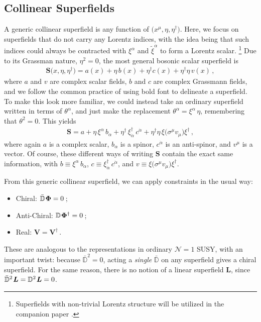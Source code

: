 \documentclass[12pt,document,nofootinbib,superscriptaddress,onecolumn,preprintnumbers,balancelastpage]{article}
\newcommand{\s}{\hspace{0.8pt}}
\newcommand{\D}{\mathbb{D}}
\begin{document}
\begin{spacing}{1.2}
\subsection{Collinear Superfields}
\label{sec:Superfields}
A generic collinear superfield is any function of $\big(x^\mu,\eta,\eta^\dagger\big)$.
%
Here, we focus on superfields that do not carry any Lorentz indices, with the idea being that such indices could always be contracted with $\xi^\alpha$ and $\tilde{\xi}^\alpha$ to form a Lorentz scalar.%
%
\footnote{Superfields with non-trivial Lorentz structure will be utilized in the companion paper \cite{Cohen:2019gsc}.} 
%
Due to its Grassman nature, $\eta^2 = 0$, the most general bosonic scalar superfield is
%
\begin{align}
\label{eq:Snotation}
\boldsymbol{S}\big(x,\eta,\eta^\dagger\big) = a(x) + \eta \, b(x) + \eta^\dagger c(x) + \eta^\dagger \eta \, v(x)\,,
\end{align}
%
where $a$ and $v$ are complex scalar fields, $b$ and $c$ are complex Grassmann fields, and we follow the common practice of using bold font to delineate a superfield.
%
To make this look more familiar, we could instead take an ordinary superfield written in terms of $\theta^\alpha$, and just make the replacement $\theta^\alpha = \xi^\alpha \,\eta$, remembering that $\theta^2 = 0$.
%
This yields
\begin{align}
\label{eq:altSnotation}
\boldsymbol{S} = a + \eta \, \xi^\alpha\, b_\alpha + \eta^\dagger\, \xi^\dagger_{\dot{\alpha}} \,c^{\dot{\alpha}} + \eta^\dagger \eta \, \xi \big(\sigma^\mu v_\mu\big) \xi^\dagger\,,
\end{align}
where again $a$ is a complex scalar, $b_\alpha$ is a spinor, $c^{\dot{\alpha}}$ is an anti-spinor, and $v^\mu$ is a vector.
%
Of course, these different ways of writing $\boldsymbol{S}$ contain the exact same information, with $b \equiv \xi^\alpha \,b_\alpha$, $c  \equiv \xi^\dagger_{\dot{\alpha}} \,c^{\dot{\alpha}}$, and $v \equiv \xi \big(\sigma^\mu v_\mu\big) \xi^\dagger$.

From this generic collinear superfield, we can apply constraints in the usual way:
%
\begin{itemize}
\item{Chiral: $\bar{\D}\s \boldsymbol{\Phi} = 0$\,;}
\item{Anti-Chiral: $\D\s \boldsymbol{\Phi}^\dagger = 0$\,;}
\item{Real: $\boldsymbol{V} = \boldsymbol{V}^\dagger$\,.}
\end{itemize}
%
These are analogous to the representations in ordinary $\mathcal{N} = 1$ SUSY, with an important twist:  because $\bar{\D}^2 = 0$, acting a \emph{single} $\bar{\D}$ on any superfield gives a chiral superfield.
%
For the same reason, there is no notion of a linear superfield $\boldsymbol{L}$, since~$\bar{\D}^2\s \boldsymbol{L} = \D^2\s \boldsymbol{L} = 0$.



\end{spacing}
\end{document}
